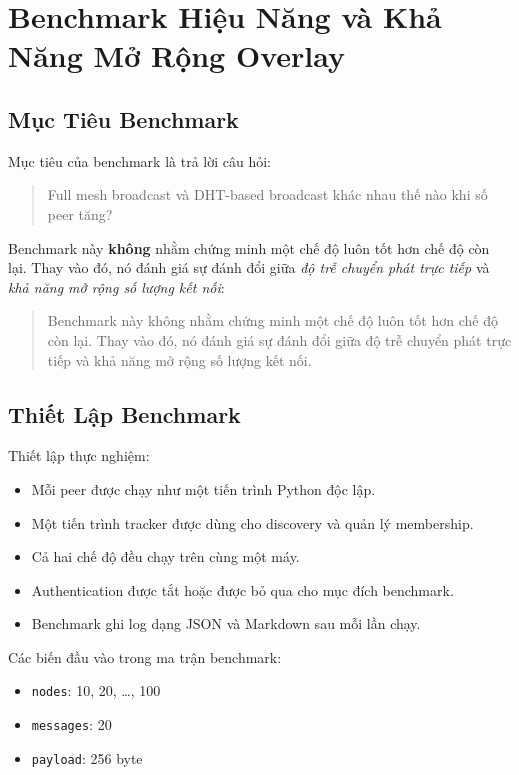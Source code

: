 \section{Benchmark Hiệu Năng và Khả Năng Mở Rộng Overlay}

\subsection{Mục Tiêu Benchmark}
Mục tiêu của benchmark là trả lời câu hỏi:

\begin{quote}
Full mesh broadcast và DHT-based broadcast khác nhau thế nào khi số peer tăng?
\end{quote}

Benchmark này \textbf{không} nhằm chứng minh một chế độ luôn tốt hơn chế độ còn lại. Thay vào đó, nó đánh giá sự đánh đổi giữa \textit{độ trễ chuyển phát trực tiếp} và \textit{khả năng mở rộng số lượng kết nối}:
\begin{quote}
Benchmark này không nhằm chứng minh một chế độ luôn tốt hơn chế độ còn lại. Thay vào đó, nó đánh giá sự đánh đổi giữa độ trễ chuyển phát trực tiếp và khả năng mở rộng số lượng kết nối.
\end{quote}

\subsection{Thiết Lập Benchmark}
Thiết lập thực nghiệm:
\begin{itemize}[leftmargin=2em]
    \item Mỗi peer được chạy như một tiến trình Python độc lập.
    \item Một tiến trình tracker được dùng cho discovery và quản lý membership.
    \item Cả hai chế độ đều chạy trên cùng một máy.
    \item Authentication được tắt hoặc được bỏ qua cho mục đích benchmark.
    \item Benchmark ghi log dạng JSON và Markdown sau mỗi lần chạy.
\end{itemize}

Các biến đầu vào trong ma trận benchmark:
\begin{itemize}[leftmargin=2em]
    \item \texttt{nodes}: 10, 20, \ldots, 100
    \item \texttt{messages}: 20
    \item \texttt{payload}: 256 byte
\end{itemize}

